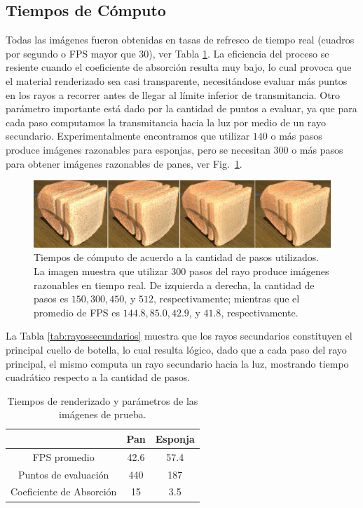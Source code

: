 \subsection*{Tiempos de Cómputo}

Todas las imágenes fueron obtenidas en tasas de refresco de tiempo real (cuadros por segundo o \acrshort{FPS} mayor que $30$), ver Tabla \ref{tab:tiemposrenderizado}.
La eficiencia del proceso se resiente cuando el coeficiente de absorción resulta muy bajo, lo cual provoca que el material renderizado sea casi transparente, necesitándose evaluar más puntos en los rayos a recorrer antes de llegar al límite inferior de transmitancia.
Otro parámetro importante está dado por la cantidad de puntos a evaluar, ya que para cada paso computamos la transmitancia hacia la luz por medio de un rayo secundario.
Experimentalmente encontramos que utilizar $140$ o más pasos produce imágenes razonables para esponjas, pero se necesitan $300$ o más pasos para obtener imágenes razonables de panes, ver Fig.~\ref{fg:stepcount}.


\begin{figure}
  \centerline{\includegraphics[width=12cm]{figures/stepcount}}
  \caption[Tiempos de cómputo de acuerdo a la cantidad de pasos utilizados]{Tiempos de cómputo de acuerdo a la cantidad de pasos utilizados. La imagen muestra que utilizar $300$ pasos del rayo produce imágenes razonables en tiempo real. De izquierda a derecha, la cantidad de pasos es $150, 300, 450$, y $512$, respectivamente; mientras que el promedio de FPS es $144.8, 85.0, 42.9$, y $41.8$, respectivamente.}
  \label{fg:stepcount}
\end{figure}

La Tabla \ref{tab:rayossecundarios} muestra que los rayos secundarios constituyen el principal cuello de botella, lo cual resulta lógico, dado que a cada paso del rayo principal, el mismo computa un rayo secundario hacia la luz, mostrando tiempo cuadrático respecto a la cantidad de pasos.


\begin{table}[htb]
\centering
\begin{tabular}{|c|c|c|}
\hline &  Pan & Esponja \\
\hline
\hline
 FPS promedio & 42.6 & 57.4\\
\hline
 Puntos de evaluación &  440  & 187 \\
\hline
 Coeficiente de Absorción &  15  & 3.5 \\
\hline
\end{tabular}
\caption{Tiempos de renderizado y parámetros de las imágenes de prueba.}
\label{tab:tiemposrenderizado}
\end{table}

